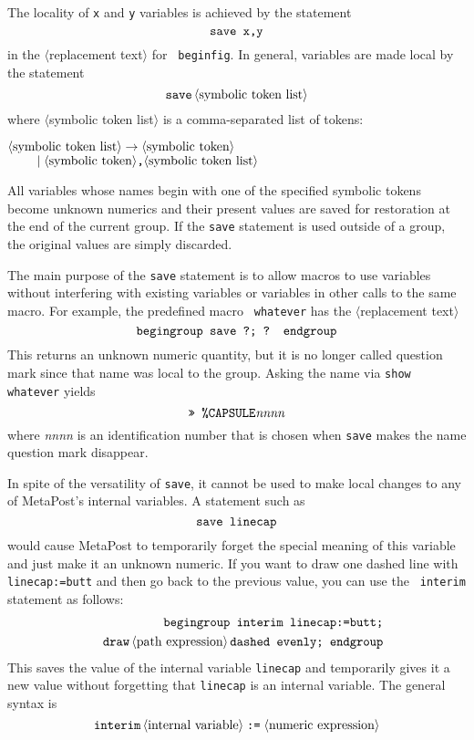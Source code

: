 \documentclass{article} %
\newcommand\descr[1]{{\langle\hbox{#1}\rangle}}
\newcommand\invisgap{\nobreak\hskip0pt\relax}
\newcommand\tdescr[1]{$\langle$\invisgap#1\invisgap$\rangle$}
\begin{document}
The locality of {\tt x} and {\tt y} variables is achieved by the
statement\label{Dsave}
$$ \hbox{\tt save x,y} $$
in the \tdescr{replacement text} for {\tt
beginfig}.  In general, variables are
made local by the statement
$$ {\tt save}\, \descr{symbolic token list} $$
where \tdescr{symbolic token list} is a comma-separated list of
tokens:
\begin{ctabbing}
$\tt \descr{symbolic token list} \rightarrow \descr{symbolic token}$\\
        $\tt \qquad \;|\; \descr{symbolic token}\hbox{\tt ,}
        \descr{symbolic token list}$
\end{ctabbing}
All variables whose names begin with one of the specified symbolic
tokens become unknown numerics and their present values are saved for
restoration at the end of the current group.  If the {\tt save}
statement is used outside of a group, the original values are simply
discarded.

The main purpose of the {\tt save} statement is to allow macros to use
variables without interfering with existing variables or variables in
other calls to the same macro.  For example, the predefined macro {\tt
whatever} has the \tdescr{replacement text}
$$ \hbox{\tt begingroup save ?; ? endgroup} $$
This returns an unknown numeric quantity, but it is no longer called
question mark since that name was local to the group.  Asking the name
via {\tt show whatever}
yields
$$ \hbox{\tt >> \%CAPSULE}{\it nnnn} $$
where {\it nnnn} is an identification number that is chosen when {\tt save}
makes the name question mark disappear.

In spite of the versatility of {\tt save}, it cannot be used to make
local changes to any of MetaPost's internal variables.  A statement such
as
$$ \hbox{\tt save linecap} $$
would cause MetaPost to temporarily forget the special meaning of this
variable and just make it an unknown numeric.  If you want to draw one
dashed line with {\tt linecap:=butt} and then go back to the previous
value, you can use the {\tt
interim}\label{Dinterm} statement as
follows:
\begin{eqnarray*}
&& \hbox{\tt begingroup interim linecap:=butt;}\\
&& {\tt draw}\, \descr{path expression}\, \hbox{\tt dashed evenly; endgroup}
\end{eqnarray*}
This saves the value of the
internal variable
{\tt linecap} and temporarily
gives it a new value without forgetting that {\tt linecap} is an internal
variable.  The general syntax is
$$ {\tt interim}\, \descr{internal variable} \mathrel{\hbox{\tt:=}}
        \descr{numeric expression}
$$
\end{document}
